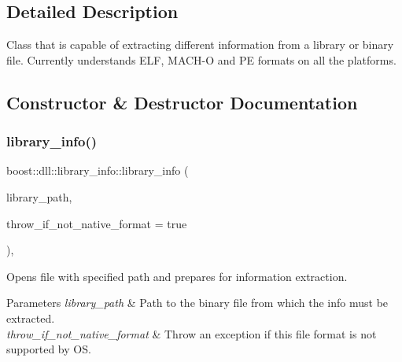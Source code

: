 \subsection{Detailed Description}
Class that is capable of extracting different information from a library or binary file. Currently understands E\+LF, M\+A\+C\+H-\/O and PE formats on all the platforms. 

\subsection{Constructor \& Destructor Documentation}
\mbox{\label{a01704_a32c4471296054be76f69deeec9be1c71}} 
\subsubsection{\texorpdfstring{library\+\_\+info()}{library\_info()}}
{\footnotesize\ttfamily boost\+::dll\+::library\+\_\+info\+::library\+\_\+info (\begin{DoxyParamCaption}\item[{const boost\+::filesystem\+::path \&}]{library\+\_\+path,  }\item[{bool}]{throw\+\_\+if\+\_\+not\+\_\+native\+\_\+format = {\ttfamily true} }\end{DoxyParamCaption})\hspace{0.3cm}{\ttfamily [inline]}, {\ttfamily [explicit]}}

Opens file with specified path and prepares for information extraction. 
\begin{DoxyParams}{Parameters}
{\em library\+\_\+path} & Path to the binary file from which the info must be extracted. \\
\hline
{\em throw\+\_\+if\+\_\+not\+\_\+native\+\_\+format} & Throw an exception if this file format is not supported by OS. \\
\hline
\end{DoxyParams}
\mbox{\label{a01704_aef1b6b0e24ced9b03ba67569ec636074}} 
